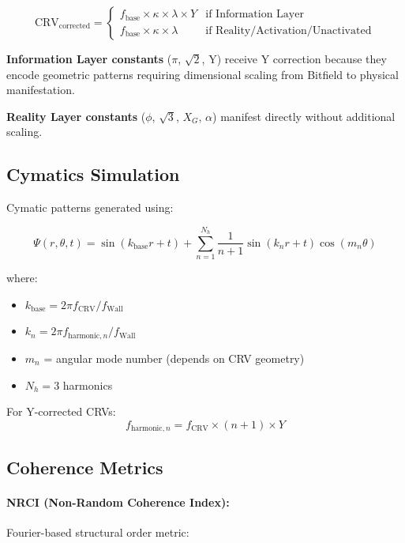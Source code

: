 \documentclass[11pt,a4paper]{article}
\begin{document}
\begin{equation}
\text{CRV}_{\text{corrected}} = \begin{cases}
f_{\text{base}} \times \kappa \times \lambda \times Y & \text{if Information Layer} \\
f_{\text{base}} \times \kappa \times \lambda & \text{if Reality/Activation/Unactivated}
\end{cases}
\end{equation}

\textbf{Information Layer constants} ($\pi$, $\sqrt{2}$, Y) receive Y correction because they encode geometric patterns requiring dimensional scaling from Bitfield to physical manifestation.

\textbf{Reality Layer constants} ($\phi$, $\sqrt{3}$, $X_G$, $\alpha$) manifest directly without additional scaling.

\subsection{Cymatics Simulation}

Cymatic patterns generated using:

\begin{equation}
\Psi(r, \theta, t) = \sin(k_{\text{base}} r + t) + \sum_{n=1}^{N_h} \frac{1}{n+1} \sin(k_n r + t) \cos(m_n \theta)
\end{equation}

where:
\begin{itemize}
    \item $k_{\text{base}} = 2\pi f_{\text{CRV}} / f_{\text{Wall}}$
    \item $k_n = 2\pi f_{\text{harmonic},n} / f_{\text{Wall}}$
    \item $m_n$ = angular mode number (depends on CRV geometry)
    \item $N_h = 3$ harmonics
\end{itemize}

For Y-corrected CRVs:
\begin{equation}
f_{\text{harmonic},n} = f_{\text{CRV}} \times (n+1) \times Y
\end{equation}

\subsection{Coherence Metrics}

\paragraph{NRCI (Non-Random Coherence Index):} Fourier-based structural order metric:
\end{document}

